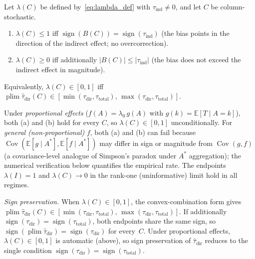 \begin{proposition}
\label{prop:lambda_bound}
Let $\lambda(C)$ be defined by~\eqref{eq:lambda_def} with $\tau_{\mathrm{ind}}\neq 0$, and let $C$ be column-stochastic.
\begin{enumerate}
\item[(a)] $\lambda(C)\leq 1$ iff $\operatorname{sign}(B(C))=\operatorname{sign}(\tau_{\mathrm{ind}})$ (the bias points in the direction of the indirect effect; no overcorrection).
\item[(b)] $\lambda(C)\geq 0$ iff additionally $|B(C)|\leq|\tau_{\mathrm{ind}}|$ (the bias does not exceed the indirect effect in magnitude).
\end{enumerate}
Equivalently, $\lambda(C)\in[0,1]$ iff $\operatorname{plim}\hat\tau_{\mathrm{dir}}(C)\in[\min(\tau_{\mathrm{dir}},\tau_{\mathrm{total}}),\,\max(\tau_{\mathrm{dir}},\tau_{\mathrm{total}})]$.

Under \emph{proportional effects} ($f(A)=\lambda_0\,g(A)$ with $g(k)=\mathbb{E}[T\mid A{=}k]$), both (a) and (b) hold for every $C$, so $\lambda(C)\in[0,1]$ unconditionally.
For \emph{general (non-proportional)} $f$, both (a) and (b) can fail because $\operatorname{Cov}(\mathbb{E}[g\mid A^*],\mathbb{E}[f\mid A^*])$ may differ in sign or magnitude from $\operatorname{Cov}(g,f)$ (a covariance-level analogue of Simpson's paradox under $A^*$ aggregation); the numerical verification below quantifies the empirical rate.
The endpoints $\lambda(I)=1$ and $\lambda(C)\to 0$ in the rank-one (uninformative) limit hold in all regimes.

\emph{Sign preservation.} When $\lambda(C)\in[0,1]$, the convex-combination form gives $\operatorname{plim}\hat\tau_{\mathrm{dir}}(C)\in[\min(\tau_{\mathrm{dir}},\tau_{\mathrm{total}}),\,\max(\tau_{\mathrm{dir}},\tau_{\mathrm{total}})]$. If additionally $\operatorname{sign}(\tau_{\mathrm{dir}})=\operatorname{sign}(\tau_{\mathrm{total}})$, both endpoints share the same sign, so $\operatorname{sign}(\operatorname{plim}\hat\tau_{\mathrm{dir}})=\operatorname{sign}(\tau_{\mathrm{dir}})$ for every~$C$. Under proportional effects, $\lambda(C)\in[0,1]$ is automatic (above), so sign preservation of $\hat\tau_{\mathrm{dir}}$ reduces to the single condition $\operatorname{sign}(\tau_{\mathrm{dir}})=\operatorname{sign}(\tau_{\mathrm{total}})$.
\end{proposition}

